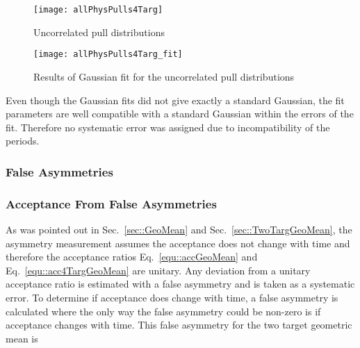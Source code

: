 \begin{figure}[h!t]
  \begin{center}
    \texttt{[image: allPhysPulls4Targ]}
    \caption{Uncorrelated pull distributions}
    \label{fig::allPhysPulls4Targ}
  \end{center}
\end{figure}

\begin{figure}[h!t]
  \begin{center}
    \texttt{[image: allPhysPulls4Targ\_fit]}
    \caption{Results of Gaussian fit for the uncorrelated pull distributions}
    \label{fig::allPhysPulls4Targ_fit}
  \end{center}
\end{figure}

Even though the Gaussian fits did not give exactly a standard Gaussian, the fit
parameters are well compatible with a standard Gaussian within the errors of the
fit.  Therefore no systematic error was assigned due to incompatibility of the
periods.

\subsubsection{False Asymmetries}
\subsubsection{Acceptance From False Asymmetries}
As was pointed out in Sec.~\ref{sec::GeoMean} and
Sec.~\ref{sec::TwoTargGeoMean}, the asymmetry measurement assumes the acceptance
does not change with time and therefore the acceptance ratios
Eq.~\ref{equ::accGeoMean} and Eq.~\ref{equ::acc4TargGeoMean} are unitary.  Any
deviation from a unitary acceptance ratio is estimated with a false asymmetry
and is taken as a systematic error.  To determine if acceptance
does change with time, a false asymmetry is calculated where the only way the
false asymmetry could be non-zero is if acceptance changes with time.  This
false asymmetry for the two target geometric mean is

